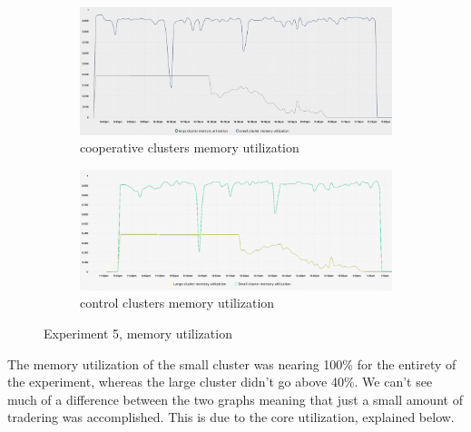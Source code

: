 \begin{figure}[H]
\centering
\begin{subfigure}{.5\textwidth}
  \centering
  \includegraphics[width=.9\linewidth]{./figures/experiment-five/alibaba-mem-coop.png}
  \caption{cooperative clusters memory utilization}
  \label{fig:exp5coopmem}
\end{subfigure}%
\begin{subfigure}{.5\textwidth}
  \centering
  \includegraphics[width=.9\linewidth]{./figures/experiment-five/alibaba-mem-control.png}
  \caption{control clusters memory utilization}
  \label{fig:exp5controlmem}
\end{subfigure}
\caption{Experiment 5, memory utilization}
\label{fig:exp5memutil}
\end{figure}

The memory utilization of the small cluster was nearing 100\% for the entirety
of the experiment, whereas the large cluster didn't go above 40\%. We can't see
much of a difference between the two graphs meaning that just a small amount of
tradering was accomplished. This is due to the core utilization, explained
below.


